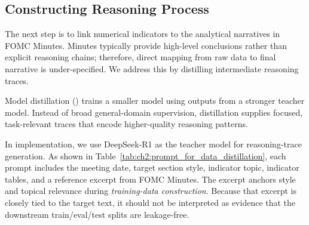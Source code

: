 \subsection*{Constructing Reasoning Process}

The next step is to link numerical indicators to the analytical narratives in FOMC Minutes. Minutes typically provide high-level conclusions rather than explicit reasoning chains; therefore, direct mapping from raw data to final narrative is under-specified. We address this by distilling intermediate reasoning traces.

Model distillation (\cite{hinton2015distilling}) trains a smaller model using outputs from a stronger teacher model. Instead of broad general-domain supervision, distillation supplies focused, task-relevant traces that encode higher-quality reasoning patterns.


In implementation, we use DeepSeek-R1 as the teacher model for reasoning-trace generation. As shown in Table~\ref{tab:ch2:prompt_for_data_distillation}, each prompt includes the meeting date, target section style, indicator topic, indicator tables, and a reference excerpt from FOMC Minutes. The excerpt anchors style and topical relevance during \textit{training-data construction}. Because that excerpt is closely tied to the target text, it should not be interpreted as evidence that the downstream train/eval/test splits are leakage-free.


